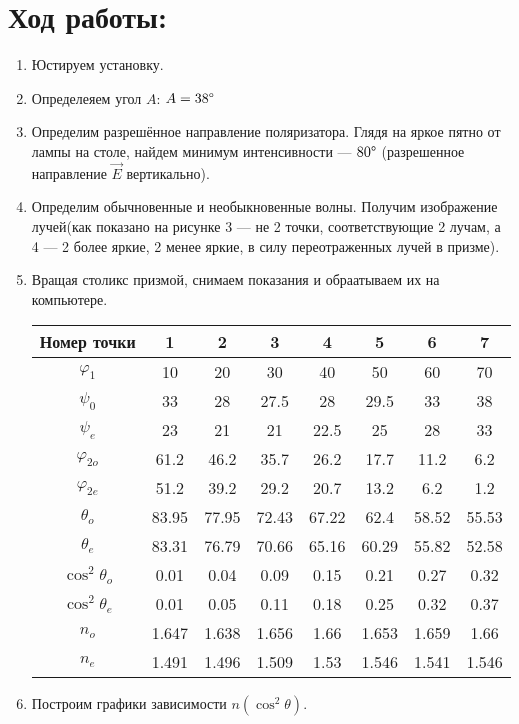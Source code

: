 \section*{Ход работы:}
\begin{enumerate}
    \item Юстируем установку.
    \item Определеяем угол $A$: $A = 38\degree$
    \item Определим разрешённое направление поляризатора. Глядя на яркое пятно от  лампы на столе, найдем минимум интенсивности --- $80\degree$ (разрешенное направление $\vec{E}$ вертикально).
    \item Определим обычновенные и необыкновенные волны. Получим изображение лучей(как показано на рисунке 3 --- не 2 точки, соответствующие 2 лучам, а 4 --- 2 более яркие, 2 менее яркие, в силу переотраженных лучей в призме).
    \item Вращая столикс призмой, снимаем показания и обраатываем их на компьютере.    
    
    \begin{tabu} to 1\textwidth{|c|c|c|c|c|c|c|c|}
    \hline
    Номер точки & 1 & 2 & 3 & 4 & 5 & 6 & 7 \\
    \hline
    $\varphi_1$ & 10 & 20 & 30 & 40 & 50 & 60 & 70 \\
    \hline
    $\psi_0$ & 33 & 28 & 27.5 & 28 & 29.5 & 33 & 38 \\
    \hline
    $\psi_e$ & 23 & 21 & 21 & 22.5 & 25 & 28 & 33 \\
    \hline
    $\varphi_{2o}$ & 61.2 & 46.2 & 35.7 & 26.2 & 17.7 & 11.2 & 6.2 \\
    \hline
    $\varphi_{2e}$ & 51.2 & 39.2 & 29.2 & 20.7 & 13.2 & 6.2 & 1.2 \\
    \hline
    $\theta_o$ & 83.95 & 77.95 & 72.43 & 67.22 & 62.4 & 58.52 & 55.53 \\
    \hline
    $\theta_e$ & 83.31 & 76.79 & 70.66 & 65.16 & 60.29 & 55.82 & 52.58 \\ 
    \hline
    $\cos^2{\theta_o} $ & 0.01 & 0.04 & 0.09 & 0.15 & 0.21 & 0.27 & 0.32 \\
    \hline
    $\cos^2{\theta_e} $ & 0.01 & 0.05 & 0.11 & 0.18 & 0.25 & 0.32 & 0.37 \\
    \hline
    $n_o $ & 1.647 & 1.638 & 1.656 & 1.66 & 1.653 & 1.659 & 1.66 \\
    \hline
    $n_e $ & 1.491 & 1.496 & 1.509 & 1.53 & 1.546 & 1.541 & 1.546 \\
    \hline
    \end{tabu}
    \item Построим графики зависимости $n(\cos^2{\theta})$.
\end{enumerate}
